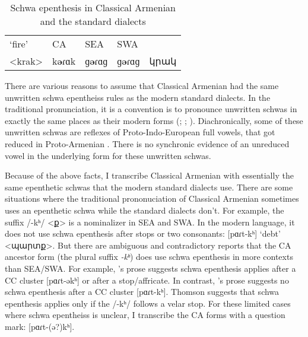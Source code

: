 \begin{table}[H]
	\caption{Schwa epenthesis in Classical Armenian and the standard dialects} \label{tab:IntroHossep:schwaEpen}
	\centering 
	\begin{tabular}{|l| lll| l| }
		\hline `fire'	& CA & SEA  & SWA & \\
		<krak> &  k\textbf{ə}ɾɑk &ɡ\textbf{ə}ɾɑɡ &ɡ\textbf{ə}ɾɑɡ & կրակ
		\\\hline 
	\end{tabular}
\end{table}

There are various reasons to assume that Classical Armenian had the same unwritten schwa epentheiss rules as the modern standard dialects. In the traditional pronunciation,  it is  a convention is to pronounce unwritten schwas in exactly the same places as their modern forms (\citealt[16]{Godel-1975-IntroClassicalArmenian}; \citealt[116]{Thomson-1989-IntroClassicalArmenian};  \citealt[1043]{Macak-2017-PhonoClassicalArmenian}).   Diachronically, some of these unwritten schwas are reflexes of   Proto-Indo-European full vowels,  that got reduced in Proto-Armenian \citep[26]{Vaux-1998-ArmenianPhono}.  There is no synchronic  evidence of an unreduced vowel in the underlying form for these unwritten schwas.

Because of the above facts, I transcribe Classical Armenian with essentially the same epenthetic schwas that the modern standard dialects use. There are some situations where the traditional prononuciation of Classical Armenian sometimes     uses an epenthetic schwa while the standard dialects don't. For example,     the suffix /-kʰ/ <ք> is a nominalizer in   SEA and SWA. In the modern language, it does not use schwa epenthesis after stops or two consonants: [pɑɾt-kʰ] `debt' <պարտք>. But there are ambiguous and contradictory reports that the CA ancestor form (the plural  suffix \textit{-kʰ})  does use schwa epenthesis in more contexts than SEA/SWA. For example,  \citealt[18-19]{Godel-1975-IntroClassicalArmenian}'s prose suggests schwa epenthesis applies   after  a CC cluster [pɑɾt-əkʰ] or after a stop/affricate. In contrast,    \citealt[120]{Thomson-1989-IntroClassicalArmenian}'s prose suggests no schwa epenthesis after a CC cluster [pɑɾt-kʰ]. Thomson suggests that schwa epenthesis applies only if the /-kʰ/ follows a velar stop. For these limited cases where schwa epentheiss is unclear, I transcribe the CA forms with a question mark: [pɑɾt-(ə?)kʰ]. 




